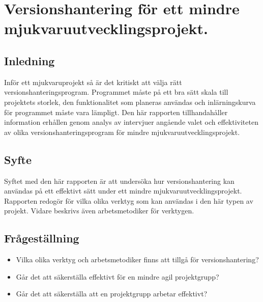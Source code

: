 

\chapter{Versionshantering för ett mindre mjukvaruutvecklingsprojekt.}



\vspace{1.5em}
\section{Inledning}
Inför ett mjukvaruprojekt så är det kritiskt att välja rätt versionshanteringsprogram. Programmet måste på ett bra sätt skala till projektets storlek, den funktionalitet som planeras användas och inlärningskurva för programmet måste vara lämpligt. Den här rapporten tillhandahåller information erhållen genom analys av intervjuer angående valet och effektiviteten av olika versionshanteringsprogram för mindre mjukvaruutvecklingsprojekt.

\vspace{1.5em}
\section{Syfte}
Syftet med den här rapporten är att undersöka hur versionshantering kan användas på ett effektivt sätt under ett mindre mjukvaruutvecklingsprojekt. Rapporten redogör för vilka olika verktyg som kan användas i den här typen av projekt. Vidare beskrivs även arbetsmetodiker för verktygen.

\vspace{1.5em}
\section{Frågeställning}
\begin{itemize} \vspace{1em}
    \item Vilka olika verktyg och arbetsmetodiker finns att tillgå för versionshantering?

    \item Går det att säkerställa effektivt för en mindre agil projektgrupp?
    \item Går det att säkerställa att en projektgrupp arbetar effektivt?

\end{itemize}


